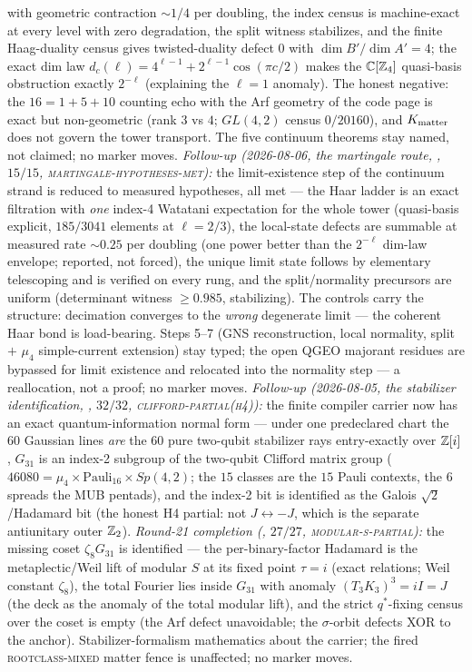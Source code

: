 with geometric contraction ${\sim}1/4$ per doubling, the index
census is machine-exact at every level with zero degradation, the
split witness stabilizes, and the finite Haag-duality census gives
twisted-duality defect $0$ with $\dim B'/\dim A'=4$; the exact dim
law $d_c(\ell)=4^{\ell-1}+2^{\ell-1}\cos(\pi c/2)$ makes the
$\mathbb C[\mathbb{Z}_4]$ quasi-basis obstruction exactly $2^{-\ell}$
(explaining the $\ell=1$ anomaly).  The honest negative: the
$16=1{+}5{+}10$ counting echo with the Arf geometry of the code
page is exact but non-geometric (rank $3$ vs $4$; $GL(4,2)$ census
$0/20160$), and $K_{\rm matter}$ does not govern the tower
transport.  The five continuum theorems stay named, not claimed;
no marker moves.
\emph{Follow-up (2026-08-06, the martingale route,
, $15/15$,
\textsc{martingale-hypotheses-met}):} the limit-existence step of
the continuum strand is reduced to measured hypotheses, all met ---
the Haar ladder is an exact filtration with \emph{one} index-4
Watatani expectation for the whole tower (quasi-basis explicit,
$185/3041$ elements at $\ell=2/3$), the local-state defects are
summable at measured rate ${\sim}0.25$ per doubling (one power
better than the $2^{-\ell}$ dim-law envelope; reported, not
forced), the unique limit state follows by elementary telescoping
and is verified on every rung, and the split/normality precursors
are uniform (determinant witness $\ge0.985$, stabilizing).  The
controls carry the structure: decimation converges to the
\emph{wrong} degenerate limit --- the coherent Haar bond is
load-bearing.  Steps 5--7 (GNS reconstruction, local normality,
split $+$ $\mu_4$ simple-current extension) stay typed; the open
QGEO majorant residues are bypassed for limit existence and
relocated into the normality step --- a reallocation, not a proof;
no marker moves.
\emph{Follow-up (2026-08-05, the stabilizer identification,
, $32/32$,
\textsc{clifford-partial(h4)}):} the finite compiler carrier now
has an exact quantum-information normal form --- under one
predeclared chart the $60$ Gaussian lines \emph{are} the $60$ pure
two-qubit stabilizer rays entry-exactly over $\mathbb{Z}[i]$, $G_{31}$ is
an index-2 subgroup of the two-qubit Clifford matrix group
($46080=\mu_4\times\mathrm{Pauli}_{16}\times Sp(4,2)$; the $15$
classes are the $15$ Pauli contexts, the $6$ spreads the MUB
pentads), and the index-2 bit is identified as the Galois
$\sqrt2$/Hadamard bit (the honest H4 partial: not
$J\leftrightarrow-J$, which is the separate antiunitary outer
$\mathbb{Z}_2$).  \emph{Round-21 completion
(, $27/27$,
\textsc{modular-s-partial}):} the missing coset $\zeta_8G_{31}$ is
identified --- the per-binary-factor Hadamard is the
metaplectic/Weil lift of modular $S$ at its fixed point $\tau=i$
(exact relations; Weil constant $\zeta_8$), the total Fourier lies
inside $G_{31}$ with anomaly $(T_3K_3)^3=iI=J$ (the deck as the
anomaly of the total modular lift), and the strict $q^{*}$-fixing
census over the coset is empty (the Arf defect unavoidable; the
$\sigma$-orbit defects XOR to the anchor).  Stabilizer-formalism
mathematics about the carrier; the fired \textsc{rootclass-mixed}
matter fence is unaffected; no marker moves.

